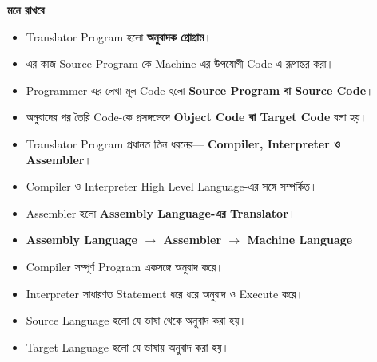 \begin{rememberbox}

\textbf{\color{deepOrange}মনে রাখবে}

\begin{itemize}

\item Translator Program হলো \textbf{অনুবাদক প্রোগ্রাম}।

\item এর কাজ Source Program-কে Machine-এর উপযোগী Code-এ রূপান্তর করা।

\item Programmer-এর লেখা মূল Code হলো
\textbf{Source Program বা Source Code}।

\item অনুবাদের পর তৈরি Code-কে প্রসঙ্গভেদে
\textbf{Object Code বা Target Code} বলা হয়।

\item Translator Program প্রধানত তিন ধরনের—
\textbf{Compiler, Interpreter ও Assembler}।

\item Compiler ও Interpreter High Level Language-এর সঙ্গে সম্পর্কিত।

\item Assembler হলো \textbf{Assembly Language-এর Translator}।

\item
\textbf{
Assembly Language
\(\rightarrow\)
Assembler
\(\rightarrow\)
Machine Language
}

\item Compiler সম্পূর্ণ Program একসঙ্গে অনুবাদ করে।

\item Interpreter সাধারণত Statement ধরে ধরে অনুবাদ ও Execute করে।

\item Source Language হলো যে ভাষা থেকে অনুবাদ করা হয়।

\item Target Language হলো যে ভাষায় অনুবাদ করা হয়।

\end{itemize}

\end{rememberbox}

\small

